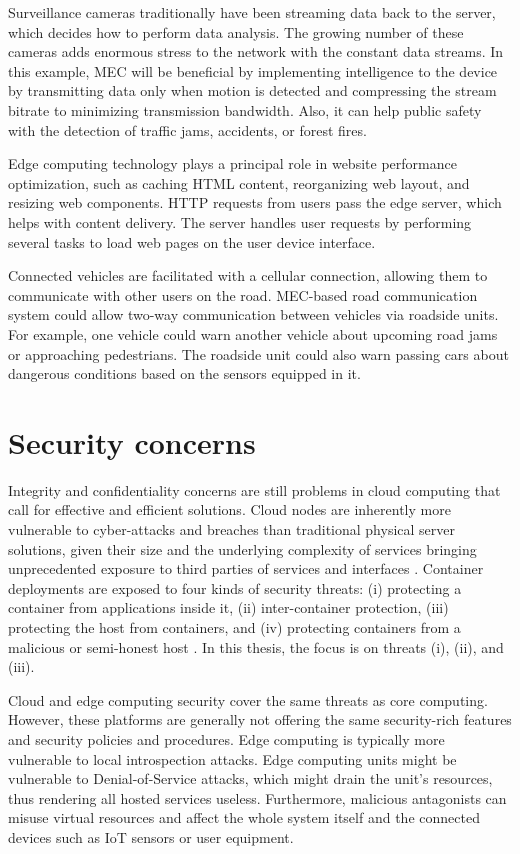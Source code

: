 Surveillance cameras traditionally have been streaming data back to the server, which decides how to perform data analysis. The growing number of these cameras adds enormous stress to the network with the constant data streams. In this example, MEC will be beneficial by implementing intelligence to the device by transmitting data only when motion is detected and compressing the stream bitrate to minimizing transmission bandwidth. Also, it can help public safety with the detection of traffic jams, accidents, or forest fires.

Edge computing technology plays a principal role in website performance optimization, such as caching HTML content, reorganizing web layout, and resizing web components. HTTP requests from users pass the edge server, which helps with content delivery. The server handles user requests by performing several tasks to load web pages on the user device interface. \cite{Abbas2018}

Connected vehicles are facilitated with a cellular connection, allowing them to communicate with other users on the road. MEC-based road communication system could allow two-way communication between vehicles via roadside units. For example, one vehicle could warn another vehicle about upcoming road jams or approaching pedestrians. The roadside unit could also warn passing cars about dangerous conditions based on the sensors equipped in it. \cite{Abbas2018}

\section{Security concerns}
\label{section:security}

Integrity and confidentiality concerns are still problems in cloud computing that call for effective and efficient solutions. Cloud nodes are inherently more vulnerable to cyber-attacks and breaches than traditional physical server solutions, given their size and the underlying complexity of services bringing unprecedented exposure to third parties of services and interfaces \cite{Lombardi2011}. Container deployments are exposed to four kinds of security threats: (i) protecting a container from applications inside it, (ii) inter-container protection, (iii) protecting the host from containers, and (iv) protecting containers from a malicious or semi-honest host \cite{Flauzac2020}. In this thesis, the focus is on threats (i), (ii), and (iii).

Cloud and edge computing security cover the same threats as core computing. However, these platforms are generally not offering the same security-rich features and security policies and procedures. Edge computing is typically more vulnerable to local introspection attacks. Edge computing units might be vulnerable to Denial-of-Service attacks, which might drain the unit's resources, thus rendering all hosted services useless. Furthermore, malicious antagonists can misuse virtual resources and affect the whole system itself and the connected devices such as IoT sensors or user equipment. \cite{EdgeComputing5G}\cite{Abbas2018}

